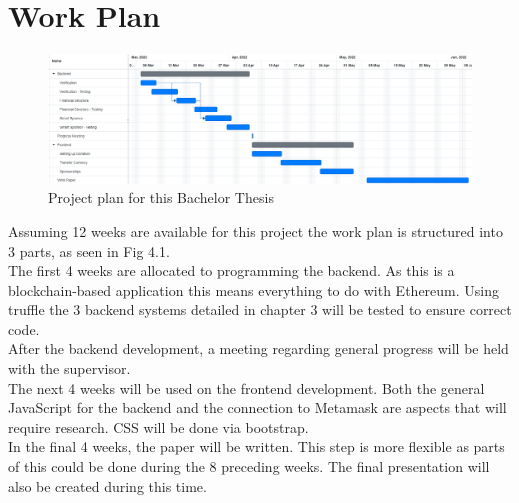 \chapter{Work Plan}
\begin{figure}
    \includegraphics[width=1 \textwidth]{figures/timeplan.PNG}  
    \caption{Project plan for this Bachelor Thesis}
    \label{fig:my_label}
\end{figure}
Assuming 12 weeks are available for this project the work plan is structured into 3 parts, as seen in Fig 4.1.\\
The first 4 weeks are allocated to programming the backend. As this is a blockchain-based application this means everything to do with Ethereum. Using truffle the 3 backend systems detailed in chapter 3 will be tested to ensure correct code.\\
After the backend development, a meeting regarding general progress will be held with the supervisor.\\
The next 4 weeks will be used on the frontend development. Both the general JavaScript for the backend and the connection to Metamask are aspects that will require research. CSS will be done via bootstrap.\\
In the final 4 weeks, the paper will be written. This step is more flexible as parts of this could be done during the 8 preceding weeks. The final presentation will also be created during this time.